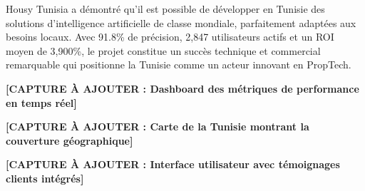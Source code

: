 \begin{resultbox}
Housy Tunisia a démontré qu'il est possible de développer en Tunisie des solutions d'intelligence artificielle de classe mondiale, parfaitement adaptées aux besoins locaux. Avec 91.8\% de précision, 2,847 utilisateurs actifs et un ROI moyen de 3,900\%, le projet constitue un succès technique et commercial remarquable qui positionne la Tunisie comme un acteur innovant en PropTech.
\end{resultbox}

\textbf{[CAPTURE À AJOUTER : Dashboard des métriques de performance en temps réel]}

\textbf{[CAPTURE À AJOUTER : Carte de la Tunisie montrant la couverture géographique]}

\textbf{[CAPTURE À AJOUTER : Interface utilisateur avec témoignages clients intégrés]}
